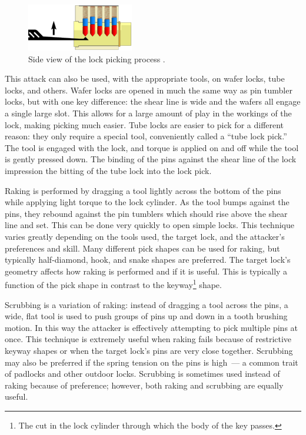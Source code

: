 \documentclass{acm_proc_article-sp}
\begin{document}
\begin{figure}[htb]
    \centering
    \includegraphics{lockpicking}
    \caption{Side view of the lock picking process \cite{TOOOL1}.}
    \label{lockpicking}
\end{figure}

This attack can also be used, with the appropriate tools, on wafer locks, tube locks, and others. Wafer locks are opened in much the same way as pin tumbler locks, but with one key difference: the shear line is wide and the wafers all engage a single large slot. This allows for a large amount of play in the workings of the lock, making picking much easier. Tube locks are easier to pick for a different reason: they only require a special tool, conveniently called a ``tube lock pick.'' The tool is engaged with the lock, and torque is applied on and off while the tool is gently pressed down. The binding of the pins against the shear line of the lock impression the bitting of the tube lock into the lock pick.

Raking is performed by dragging a tool lightly across the bottom of the pins while applying light torque to the lock cylinder. As the tool bumps against the pins, they rebound against the pin tumblers which should rise above the shear line and set. This can be done very quickly to open simple locks. This technique varies greatly depending on the tools used, the target lock, and the attacker's preferences and skill. Many different pick shapes can be used for raking, but typically half-diamond, hook, and snake shapes are preferred. The target lock's geometry affects how raking is performed and if it is useful. This is typically a function of the pick shape in contrast to the keyway\footnote{The cut in the lock cylinder through which the body of the key passes.} shape.

Scrubbing is a variation of raking: instead of dragging a tool across the pins, a wide, flat tool is used to push groups of pins up and down in a tooth brushing motion. In this way the attacker is effectively attempting to pick multiple pins at once. This technique is extremely useful when raking fails because of restrictive keyway shapes or when the target lock's pins are very close together. Scrubbing may also be preferred if the spring tension on the pins is high~--- a common trait of padlocks and other outdoor locks. Scrubbing is sometimes used instead of raking because of preference; however, both raking and scrubbing are equally useful.
\end{document}
